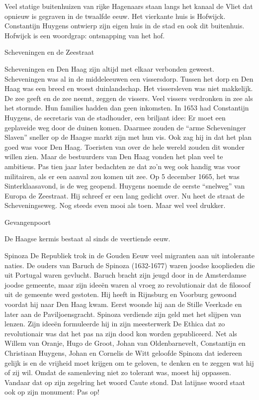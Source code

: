 \documentclass[
  a4paper,
]{book}
\theoremstyle{definition}
\theoremstyle{definition}
\theoremstyle{definition}
\theoremstyle{definition}
\theoremstyle{remark}
\begin{document}
Veel statige buitenhuizen van rijke Hagenaars staan langs het kanaal de Vliet dat opnieuw is gegraven in de twaalfde eeuw. Het vierkante huis is Hofwijck. Constantijn Huygens ontwierp zijn eigen huis in de stad en ook dit buitenhuis. Hofwijck is een woordgrap: ontsnapping van het hof.

Scheveningen en de Zeestraat

Scheveningen en Den Haag zijn altijd met elkaar verbonden geweest.
Scheveningen was al in de middeleeuwen een vissersdorp.
Tussen het dorp en Den Haag was een breed en woest duinlandschap.
Het vissersleven was niet makkelijk.
De zee geeft en de zee neemt, zeggen de vissers.
Veel vissers verdronken in zee als het stormde.
Hun families hadden dan geen inkomsten.
In 1653 had Constantijn Huygens, de secretaris van de stadhouder, een briljant idee:
Er moet een geplaveide weg door de duinen komen.
Daarmee zouden de ``arme Scheveninger Slaven'' sneller op de Haagse markt zijn met hun vis.
Ook zag hij in dat het plan goed was voor Den Haag.
Toeristen van over de hele wereld zouden dit wonder willen zien.
Maar de bestuurders van Den Haag vonden het plan veel te ambitieus.
Pas tien jaar later bedachten ze dat zo'n weg ook handig was voor militairen, als er een aanval zou komen uit zee.
Op 5 december 1665, het was Sinterklaasavond, is de weg geopend.
Huygens noemde de eerste ``snelweg'' van Europa de Zeestraat.
Hij schreef er een lang gedicht over.
Nu heet de straat de Scheveningseweg.
Nog steeds even mooi als toen.
Maar wel veel drukker.

Gevangenpoort

De Haagse kermis bestaat al sinds de veertiende eeuw.

Spinoza
De Republiek trok in de Gouden Eeuw veel migranten aan uit intolerante naties. De ouders van Baruch de Spinoza (1632-1677) waren joodse kooplieden die uit Portugal waren gevlucht. Baruch bracht zijn jeugd door in de Amsterdamse joodse gemeente, maar zijn ideeën waren al vroeg zo revolutionair dat de filosoof uit de gemeente werd gestoten. Hij heeft in Rijnsburg en Voorburg gewoond voordat hij naar Den Haag kwam. Eerst woonde hij aan de Stille Veerkade en later aan de Paviljoensgracht. Spinoza verdiende zijn geld met het slijpen van lenzen. Zijn ideeën formuleerde hij in zijn meesterwerk De Ethica dat zo revolutionair was dat het pas na zijn dood kon worden gepubliceerd. Net als Willem van Oranje, Hugo de Groot, Johan van Oldenbarnevelt, Constantijn en Christiaan Huygens, Johan en Cornelis de Witt geloofde Spinoza dat iedereen gelijk is en de vrijheid moet krijgen om te geloven, te denken en te zeggen wat hij of zij wil. Omdat de samenleving niet zo tolerant was, moest hij oppassen. Vandaar dat op zijn zegelring het woord Caute stond. Dat latijnse woord staat ook op zijn monument: Pas op!
\end{document}
